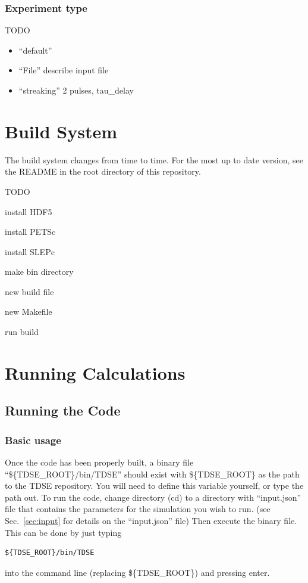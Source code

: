 \documentclass{article}
\begin{document}
\subsubsection{Experiment type} %
\label{ssub:experiment_type}
TODO
\begin{itemize}
  \item ``default''
  \item ``File'' describe input file
  \item ``streaking'' 2 pulses, tau\_delay
\end{itemize}



\section{Build System} %
\label{sec:build_system}
The build system changes from time to time. For the most up to date version, see the README in the root directory of this repository.

TODO

install HDF5

install PETSc

install SLEPc

make bin directory

new build file

new Makefile

run build

\section{Running Calculations} %
\label{sec:running_tdse_and_best_practices}
\subsection{Running the Code} %
\label{sub:running_the_code}
\subsubsection{Basic usage} %
\label{ssub:basic_usage}
Once the code has been properly built, a binary file ``\$\{TDSE\_ROOT\}/bin/TDSE'' should exist with \$\{TDSE\_ROOT\} as the path to the TDSE repository. You will need to define this variable yourself, or type the path out. To run the code, change directory (cd) to a directory with ``input.json'' file that contains the parameters for the simulation you wish to run. (see Sec.~\ref{sec:input} for details on the ``input.json'' file) Then execute the binary file. This can be done by just typing 
\begin{verbatim}
${TDSE_ROOT}/bin/TDSE
\end{verbatim}
into the command line (replacing \$\{TDSE\_ROOT\}) and pressing enter.
\end{document}
